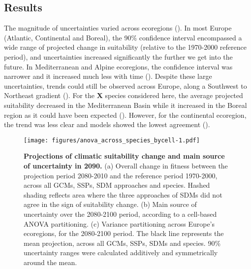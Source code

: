 \documentclass[letterpaper,8pt]{extarticle}  %
\begin{document}
\begin{doublespacing}
\begin{linenumbers}
\section{Results}


The magnitude of uncertainties varied across ecoregions (). In most Europe (Atlantic, Continental and Boreal), the 90\% confidence interval encompassed a wide range of projected change in suitability (relative to the 1970-2000 reference period), and uncertainties increased significantly the further we get into the future. In Mediterranean and Alpine ecoregions, the confidence interval was narrower and it increased much less with time (). Despite these large uncertainties, trends could still be observed across Europe, along a Southwest to Northeast gradient (). For the \textbf{X} species considered here, the average projected suitability decreased in the Mediterranean Basin while it increased in the Boreal region as it could have been expected (). However, for the continental ecoregion, the trend was less clear and models showed the lowest agreement ().

\begin{figure}[hp]
\centering
\begin{subcaptiongroup}
\label{fig:anova2090A} 
\label{fig:anova2090B}
\label{fig:anova2090C}
\end{subcaptiongroup}
\texttt{[image: figures/anova\_across\_species\_bycell-1.pdf]}
\caption{\textbf{Projections of climatic suitability change and main source of uncertainty in 2090.} (a) Overall change in fitness between the projection period 2080-2010 and the reference period 1970-2000, across all GCMs, SSPs, SDM approaches and species. Hashed shading reflects area where the three approaches of SDMs did not agree in the sign of suitability change. (b) Main source of uncertainty over the 2080-2100 period, according to a cell-based ANOVA partitioning. (c) Variance partitioning across Europe's ecoregions, for the 2080-2100 period. The black line represents the mean projection, across all GCMs, SSPs, SDMs and species. 90\% uncertainty ranges were calculated additively and symmetrically around the mean.}
\label{fig:anova2090}
\end{figure}


\end{linenumbers}
\end{doublespacing}
\end{document}
